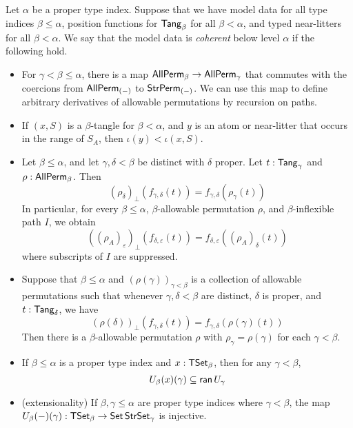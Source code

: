 \begin{definition}
  \label{def:CoherentData}
  Let \( \alpha \) be a proper type index.
  Suppose that we have model data for all type indices \( \beta \leq \alpha \), position functions for \( \mathsf{Tang}_\beta \) for all \( \beta < \alpha \), and typed near-litters for all \( \beta < \alpha \).
  We say that the model data is \emph{coherent} below level \( \alpha \) if the following hold.
  \begin{itemize}
    \item For \( \gamma < \beta \leq \alpha \), there is a map \( \mathsf{AllPerm}_\beta \to \mathsf{AllPerm}_\gamma \) that commutes with the coercions from \( \mathsf{AllPerm}_{(-)} \) to \( \mathsf{StrPerm}_{(-)} \).
    We can use this map to define arbitrary derivatives of allowable permutations by recursion on paths.
    \item If \( (x, S) \) is a \( \beta \)-tangle for \( \beta < \alpha \), and \( y \) is an atom or near-litter that occurs in the range of \( S_A \), then \( \iota(y) < \iota(x, S) \).
    \item Let \( \beta \leq \alpha \), and let \( \gamma, \delta < \beta \) be distinct with \( \delta \) proper.
    Let \( t : \mathsf{Tang}_\gamma \) and \( \rho : \mathsf{AllPerm}_\beta \).
    Then
    \[ (\rho_\delta)_\bot(f_{\gamma,\delta}(t)) = f_{\gamma,\delta}(\rho_\gamma(t)) \]
    In particular, for every \( \beta \leq \alpha \), \( \beta \)-allowable permutation \( \rho \), and \( \beta \)-inflexible path \( I \), we obtain
    \[ ((\rho_A)_\varepsilon)_\bot(f_{\delta,\varepsilon}(t)) = f_{\delta,\varepsilon}((\rho_A)_\delta(t)) \]
    where subscripts of \( I \) are suppressed.
    \item Suppose that \( \beta \leq \alpha \) and \( (\rho(\gamma))_{\gamma < \beta} \) is a collection of allowable permutations such that whenever \( \gamma, \delta < \beta \) are distinct, \( \delta \) is proper, and \( t : \mathsf{Tang}_\delta \), we have
    \[ (\rho(\delta))_\bot(f_{\gamma,\delta}(t)) = f_{\gamma,\delta}(\rho(\gamma)(t)) \]
    Then there is a \( \beta \)-allowable permutation \( \rho \) with \( \rho_\gamma = \rho(\gamma) \) for each \( \gamma < \beta \).
    \item If \( \beta \leq \alpha \) is a proper type index and \( x : \mathsf{TSet}_\beta \), then for any \( \gamma < \beta \),
    \[ U_\beta(x)(\gamma) \subseteq \operatorname{\mathsf{ran}} U_\gamma \]
    \item (extensionality) If \( \beta, \gamma \leq \alpha \) are proper type indices where \( \gamma < \beta \), the map \( U_\beta(-)(\gamma) : \mathsf{TSet}_\beta \to \operatorname{\mathsf{Set}} \mathsf{StrSet}_\gamma \) is injective.

\end{itemize}
\end{definition}
